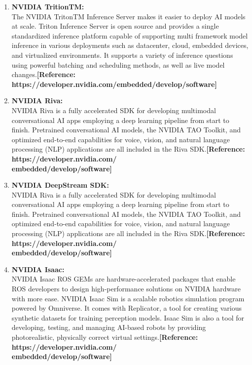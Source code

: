 \begin{enumerate}
	\item \textbf{NVIDIA TritionTM:}\\
	The NVIDIA TritonTM Inference Server makes it easier to deploy AI models at scale. Triton Inference Server is open source and provides a single standardized inference platform capable of supporting multi framework model inference in various deployments such as datacenter, cloud, embedded devices, and virtualized environments. It supports a variety of inference questions using powerful batching and scheduling methods, as well as live model changes.\textbf{[Reference: https://developer.nvidia.com/embedded/develop/software]}
	
	\item \textbf{NVIDIA Riva:}\\
	NVIDIA Riva is a fully accelerated SDK for developing multimodal conversational AI apps employing a deep learning pipeline from start to finish. Pretrained conversational AI models, the NVIDIA TAO Toolkit, and optimized end-to-end capabilities for voice, vision, and natural language processing (NLP) applications are all included in the Riva SDK.\textbf{[Reference: https://developer.nvidia.com/\\embedded/develop/software]}
	
	\item \textbf{NVIDIA DeepStream SDK:}\\
	NVIDIA Riva is a fully accelerated SDK for developing multimodal conversational AI apps employing a deep learning pipeline from start to finish. Pretrained conversational AI models, the NVIDIA TAO Toolkit, and optimized end-to-end capabilities for voice, vision, and natural language processing (NLP) applications are all included in the Riva SDK.\textbf{[Reference: https://developer.nvidia.com/\\embedded/develop/software]}
	
	\item \textbf{NVIDIA Isaac:}\\
	NVIDIA Isaac ROS GEMs are hardware-accelerated packages that enable ROS developers to design high-performance solutions on NVIDIA hardware with more ease. NVIDIA Isaac Sim is a scalable robotics simulation program powered by Omniverse. It comes with Replicator, a tool for creating various synthetic datasets for training perception models. Isaac Sim is also a tool for developing, testing, and managing AI-based robots by providing photorealistic, physically correct virtual settings.\textbf{[Reference: https://developer.nvidia.com/\\embedded/develop/software]}
	
\end{enumerate}
